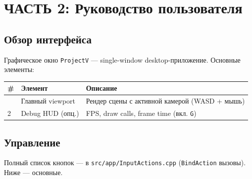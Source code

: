 \section{ЧАСТЬ 2: Руководство пользователя}\label{KT-3.1_User_Guide-ux447ux430ux441ux442ux44c-2-ux440ux443ux43aux43eux432ux43eux434ux441ux442ux432ux43e-ux43fux43eux43bux44cux437ux43eux432ux430ux442ux435ux43bux44f}

\subsection{Обзор интерфейса}\label{KT-3.1_User_Guide-ux43eux431ux437ux43eux440-ux438ux43dux442ux435ux440ux444ux435ux439ux441ux430}

Графическое окно \texttt{ProjectV} --- single-window desktop-приложение. Основные элементы:

\begin{longtable}[]{@{}lll@{}}
\toprule\noalign{}
\# & Элемент & Описание \\
\midrule\noalign{}
\endhead
\bottomrule\noalign{}
\endlastfoot
1 & Главный viewport & Рендер сцены с активной камерой (WASD + мышь) \\
2 & Debug HUD (опц.) & FPS, draw calls, frame time (вкл. \texttt{G}) \\
\end{longtable}

\subsection{Управление}\label{KT-3.1_User_Guide-ux443ux43fux440ux430ux432ux43bux435ux43dux438ux435}

Полный список кнопок --- в \texttt{src/app/InputActions.cpp} (\texttt{BindAction} вызовы). Ниже --- основные.


